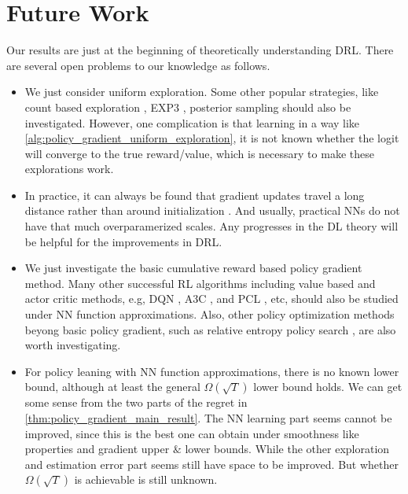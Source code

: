 \section{Future Work}
\label{sec:future_work}

Our results are just at the beginning of theoretically understanding DRL. There are several open problems to our knowledge as follows.
\begin{itemize}
    \item We just consider uniform exploration. Some other popular strategies, like count based exploration \cite{auer2002finite}, EXP3 \citep{seldin2014one}, posterior sampling \citep{agrawal2012analysis} should also be investigated. However, one complication is that learning in a way like \cref{alg:policy_gradient_uniform_exploration}, it is not known whether the logit will converge to the true reward/value, which is necessary to make these explorations work.
    \item In practice, it can always be found that gradient updates travel a long distance rather than around initialization \citep{liu2018deeptracker}. And usually, practical NNs do not have that much overparamerized scales. Any progresses in the DL theory will be helpful for the  improvements in DRL.
    \item We just investigate the basic cumulative reward based policy gradient method. Many other successful RL algorithms including value based and actor critic methods, e.g, DQN \cite{mnih2015human}, A3C \citep{mnih2016asynchronous}, and PCL \citep{nachum2017bridging}, etc, should also be studied under NN function approximations. Also, other policy optimization methods beyong basic policy gradient, such as relative entropy policy search \citep{peters2010relative}, are also worth investigating.
    \item For policy leaning with NN function approximations, there is no known lower bound, although at least the general $\Omega\left(\sqrt{T}\right)$ lower bound holds. We can get some sense from the two parts of the regret in \cref{thm:policy_gradient_main_result}. The NN learning part seems cannot be improved, since this is the best one can obtain under smoothness like properties and gradient upper $\&$ lower bounds. While the other exploration and estimation error part seems still have space to be improved. But whether $\Omega\left(\sqrt{T}\right)$ is achievable is still unknown.
\end{itemize}

\nocite{langley00}
\fi